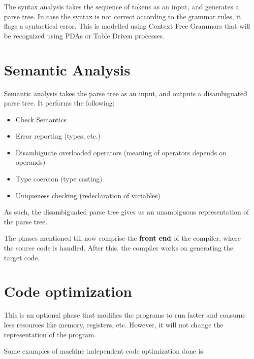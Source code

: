 \documentclass[12pt,letterpaper]{book}
\theoremstyle{definition}
\begin{document}
The syntax analysis takes the sequence of tokens as an input, and generates a parse tree. In case the syntax is not correct according to the grammar rules, it flags a syntactical error. This is modelled using Context Free Grammars that will be recognized using PDAs or Table Driven processes.

\section{Semantic Analysis}

Semantic analysis takes the parse tree as an input, and outputs a disambiguated parse tree. It performs the following:

\begin{itemize}
  \item Check Semantics
  \item Error reporting (types, etc.)
  \item Disambiguate overloaded operators (meaning of operators depends on operands)
  \item Type coercion (type casting)
  \item Uniqueness checking (redeclaration of variables)
\end{itemize}

As such, the disambiguated parse tree gives us an unambiguous representation of the parse tree.

The phases mentioned till now comprise the \textbf{front end} of the compiler, where the source code is handled. After this, the compiler works on generating the target code.

\section{Code optimization}

This is an optional phase that modifies the programs to run faster and consume less resources like memory, registers, etc. However, it will not change the representation of the program.

Some examples of machine independent code optimization done is:
\end{document}
